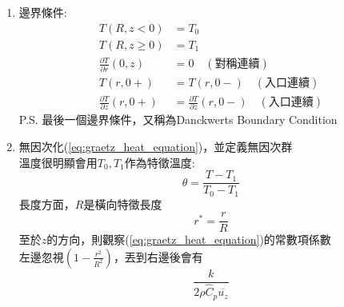 \documentclass[../main.tex]{subfiles}
\begin{document}
\begin{itemize}
\begin{enumerate}
    \begin{equation}
      \rho \hat C_p \left(
        \vec{\bm v} \cdot \nabla T
      \right) = k \nabla^2 T
    \end{equation}
    展開我們已知的項，$T(r,z)$ only
    \begin{align}
      \rho \hat C_p \left(
        u_z \frac{\partial T}{\partial z}
      \right) &= k \left( \frac{1}{r} \frac{\partial}{\partial r} \left( r \frac{\partial T}{\partial r} \right)
      + \frac{\partial^2 T}{\partial z^2}\right) \nonumber\\
      2 \rho \hat C_p \left(
        \overline{u_z}\left[1-\left(\frac{r}{R}\right)^2\right] \frac{\partial T}{\partial z}
      \right) &= k \left[
        \frac{1}{r} \frac{\partial}{\partial r} \left( r \frac{\partial T}{\partial r} \right)+
        \frac{\partial^2 T}{\partial z^2}
        \right] \label{eq:graetz_heat_equation}
    \end{align}
    \item 邊界條件:
    \begin{align}
      T(R,z<0) &= T_0 \label{eq:graetz_bc1}\\
      T(R,z\ge0) &= T_1 \label{eq:graetz_bc2}\\
      \frac{\partial T}{\partial r}(0,z) &= 0 \quad (\text{對稱連續}) \label{eq:graetz_bc3}\\
      T(r,0+) &= T(r,0-) \quad (\text{入口連續}) \label{eq:graetz_bc4} \\
      \frac{\partial T}{\partial z}(r,0+) &= \frac{\partial T}{\partial z}(r,0-) \quad (\text{入口連續}) \label{eq:graetz_bc5}
    \end{align}
    P.S. 最後一個邊界條件，又稱為Danckwerts Boundary Condition
    \item 無因次化(\ref{eq:graetz_heat_equation})，並定義無因次群\\
    溫度很明顯會用$T_0,T_1$作為特徵溫度:
    \begin{equation}
      \theta = \frac{T - T_1}{T_0 - T_1}
    \end{equation}
    長度方面，$R$是橫向特徵長度
    \begin{equation}
      r^\ast = \frac{r}{R}
    \end{equation}
    至於$z$的方向，則觀察(\ref{eq:graetz_heat_equation})的常數項係數\\
    左邊忽視$\left(1-\frac{r^2}{R^2}\right)$，丟到右邊後會有
    \begin{equation}
      \frac{k}{2 \rho \hat C_p \overline{u_z}}
    \end{equation}

\end{enumerate}
\end{itemize}
\end{document}
